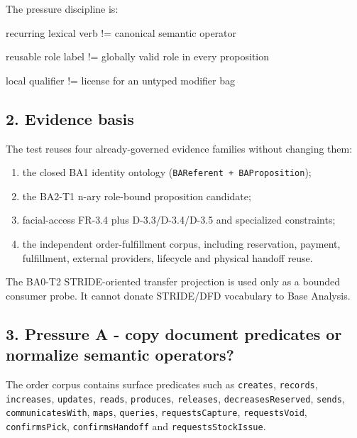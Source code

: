 \documentclass[
  10pt,
  letterpaper,
]{article}
\newenvironment{Shaded}{}{}
\newcommand{\NormalTok}[1]{#1}
\providecommand{\tightlist}{%
  \setlength{\itemsep}{0pt}\setlength{\parskip}{0pt}}
\begin{document}
The pressure discipline is:

\begin{Shaded}
\begin{Highlighting}[]
\NormalTok{recurring lexical verb}
\NormalTok{        !=}
\NormalTok{canonical semantic operator}

\NormalTok{reusable role label}
\NormalTok{        !=}
\NormalTok{globally valid role in every proposition}

\NormalTok{local qualifier}
\NormalTok{        !=}
\NormalTok{license for an untyped modifier bag}
\end{Highlighting}
\end{Shaded}

\subsection{2. Evidence basis}\label{evidence-basis}

The test reuses four already-governed evidence families without changing
them:

\begin{enumerate}
\def\labelenumi{\arabic{enumi}.}
\tightlist
\item
  the closed BA1 identity ontology
  (\texttt{BAReferent\ +\ BAProposition});
\item
  the BA2-T1 n-ary role-bound proposition candidate;
\item
  facial-access FR-3.4 plus D-3.3/D-3.4/D-3.5 and specialized
  constraints;
\item
  the independent order-fulfillment corpus, including reservation,
  payment, fulfillment, external providers, lifecycle and physical
  handoff reuse.
\end{enumerate}

The BA0-T2 STRIDE-oriented transfer projection is used only as a bounded
consumer probe. It cannot donate STRIDE/DFD vocabulary to Base Analysis.

\subsection{3. Pressure A - copy document predicates or normalize
semantic
operators?}\label{pressure-a---copy-document-predicates-or-normalize-semantic-operators}

The order corpus contains surface predicates such as \texttt{creates},
\texttt{records}, \texttt{increases}, \texttt{updates}, \texttt{reads},
\texttt{produces}, \texttt{releases}, \texttt{decreasesReserved},
\texttt{sends}, \texttt{communicatesWith}, \texttt{maps},
\texttt{queries}, \texttt{requestsCapture}, \texttt{requestsVoid},
\texttt{confirmsPick}, \texttt{confirmsHandoff} and
\texttt{requestsStockIssue}.
\end{document}
